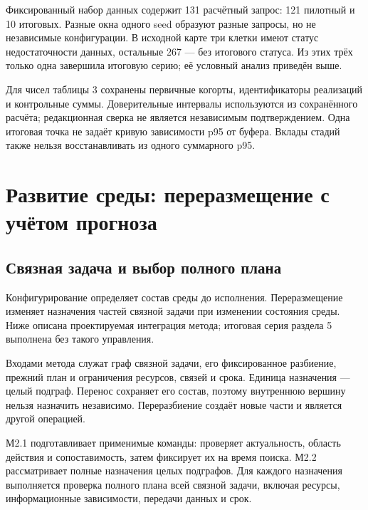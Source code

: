 Фиксированный набор данных содержит 131 расчётный запрос: 121 пилотный и 10 итоговых. Разные окна одного seed образуют разные запросы, но не независимые конфигурации. В исходной карте три клетки имеют статус недостаточности данных, остальные 267 --- без итогового статуса. Из этих трёх только одна завершила итоговую серию; её условный анализ приведён выше.

Для чисел таблицы 3 сохранены первичные когорты, идентификаторы реализаций и контрольные суммы. Доверительные интервалы используются из сохранённого расчёта; редакционная сверка не является независимым подтверждением. Одна итоговая точка не задаёт кривую зависимости p95 от буфера. Вклады стадий также нельзя восстанавливать из одного суммарного p95.

\hypertarget{ux440ux430ux437ux432ux438ux442ux438ux435-ux441ux440ux435ux434ux44b-ux43fux435ux440ux435ux440ux430ux437ux43cux435ux449ux435ux43dux438ux435-ux441-ux443ux447ux451ux442ux43eux43c-ux43fux440ux43eux433ux43dux43eux437ux430}{%
\section{Развитие среды: переразмещение с учётом прогноза}}

\hypertarget{ux441ux432ux44fux437ux43dux430ux44f-ux437ux430ux434ux430ux447ux430-ux438-ux432ux44bux431ux43eux440-ux43fux43eux43bux43dux43eux433ux43e-ux43fux43bux430ux43dux430}{%
\subsection{Связная задача и выбор полного плана}}

Конфигурирование определяет состав среды до исполнения. Переразмещение изменяет назначения частей связной задачи при изменении состояния среды. Ниже описана проектируемая интеграция метода; итоговая серия раздела 5 выполнена без такого управления.

Входами метода служат граф связной задачи, его фиксированное разбиение, прежний план и ограничения ресурсов, связей и срока. Единица назначения --- целый подграф. Перенос сохраняет его состав, поэтому внутреннюю вершину нельзя назначить независимо. Переразбиение создаёт новые части и является другой операцией.

М2.1 подготавливает применимые команды: проверяет актуальность, область действия и сопоставимость, затем фиксирует их на время поиска. М2.2 рассматривает полные назначения целых подграфов. Для каждого назначения выполняется проверка полного плана всей связной задачи, включая ресурсы, информационные зависимости, передачи данных и срок.

